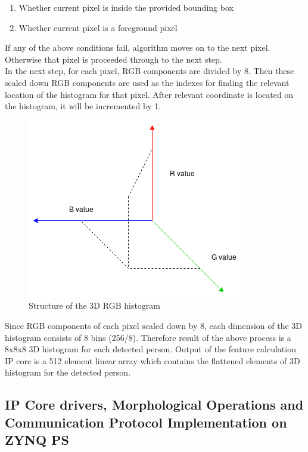 \documentclass[12pt,a4paper]{report}
\begin{document}
\begin{enumerate}
\item Whether current pixel is inside the provided bounding box
\item Whether current pixel is a foreground pixel
\end{enumerate}
If any of the above conditions fail, algorithm moves on to the next pixel. Otherwise that pixel is proceeded through to the next step.\\
In the next step, for each pixel, RGB components are divided by 8. Then these scaled down RGB components are used as the indexes for finding the relevant location of the histogram for that pixel. After relevant coordinate is located on the histogram, it will be incremented by 1.
\begin{figure}[H]
\includegraphics[width=\textwidth]{test.png}
\centering
\caption{Structure of the 3D RGB histogram}
\label{morphology}
\end{figure}

Since RGB components of each pixel scaled down by 8, each dimension of the 3D histogram consists of 8 bins (256/8). Therefore result of the above process is a 8x8x8 3D histogram for each detected person. Output of the feature calculation IP core is a 512 element linear array which contains the flattened elements of 3D histogram for the detected person.

\subsection{IP Core drivers, Morphological Operations and Communication Protocol Implementation on ZYNQ PS}
\end{document}
